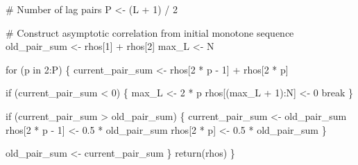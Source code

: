 \documentclass[
  letterpaper,
  DIV=11,
  numbers=noendperiod]{scrartcl}
\newenvironment{Shaded}{\begin{snugshade}}{\end{snugshade}}
\newcommand{\CommentTok}[1]{\textcolor[rgb]{0.37,0.37,0.37}{#1}}
\newcommand{\ControlFlowTok}[1]{\textcolor[rgb]{0.00,0.23,0.31}{#1}}
\newcommand{\DecValTok}[1]{\textcolor[rgb]{0.68,0.00,0.00}{#1}}
\newcommand{\FloatTok}[1]{\textcolor[rgb]{0.68,0.00,0.00}{#1}}
\newcommand{\FunctionTok}[1]{\textcolor[rgb]{0.28,0.35,0.67}{#1}}
\newcommand{\NormalTok}[1]{\textcolor[rgb]{0.00,0.23,0.31}{#1}}
\newcommand{\OtherTok}[1]{\textcolor[rgb]{0.00,0.23,0.31}{#1}}
\newcommand{\SpecialCharTok}[1]{\textcolor[rgb]{0.37,0.37,0.37}{#1}}
\begin{document}
\begin{Shaded}
\begin{Highlighting}[]
  \CommentTok{\# Number of lag pairs}
\NormalTok{  P }\OtherTok{\textless{}{-}}\NormalTok{ (L }\SpecialCharTok{+} \DecValTok{1}\NormalTok{) }\SpecialCharTok{/} \DecValTok{2}

  \CommentTok{\# Construct asymptotic correlation from initial monotone sequence}
\NormalTok{  old\_pair\_sum }\OtherTok{\textless{}{-}}\NormalTok{ rhos[}\DecValTok{1}\NormalTok{] }\SpecialCharTok{+}\NormalTok{ rhos[}\DecValTok{2}\NormalTok{]}
\NormalTok{  max\_L }\OtherTok{\textless{}{-}}\NormalTok{ N}

  \ControlFlowTok{for}\NormalTok{ (p }\ControlFlowTok{in} \DecValTok{2}\SpecialCharTok{:}\NormalTok{P) \{}
\NormalTok{    current\_pair\_sum }\OtherTok{\textless{}{-}}\NormalTok{ rhos[}\DecValTok{2} \SpecialCharTok{*}\NormalTok{ p }\SpecialCharTok{{-}} \DecValTok{1}\NormalTok{] }\SpecialCharTok{+}\NormalTok{ rhos[}\DecValTok{2} \SpecialCharTok{*}\NormalTok{ p]}
  
    \ControlFlowTok{if}\NormalTok{ (current\_pair\_sum }\SpecialCharTok{\textless{}} \DecValTok{0}\NormalTok{) \{}
\NormalTok{      max\_L }\OtherTok{\textless{}{-}} \DecValTok{2} \SpecialCharTok{*}\NormalTok{ p}
\NormalTok{      rhos[(max\_L }\SpecialCharTok{+} \DecValTok{1}\NormalTok{)}\SpecialCharTok{:}\NormalTok{N] }\OtherTok{\textless{}{-}} \DecValTok{0}
      \ControlFlowTok{break}
\NormalTok{    \}}
  
    \ControlFlowTok{if}\NormalTok{ (current\_pair\_sum }\SpecialCharTok{\textgreater{}}\NormalTok{ old\_pair\_sum) \{}
\NormalTok{      current\_pair\_sum }\OtherTok{\textless{}{-}}\NormalTok{ old\_pair\_sum}
\NormalTok{      rhos[}\DecValTok{2} \SpecialCharTok{*}\NormalTok{ p }\SpecialCharTok{{-}} \DecValTok{1}\NormalTok{] }\OtherTok{\textless{}{-}} \FloatTok{0.5} \SpecialCharTok{*}\NormalTok{ old\_pair\_sum}
\NormalTok{      rhos[}\DecValTok{2} \SpecialCharTok{*}\NormalTok{ p] }\OtherTok{\textless{}{-}} \FloatTok{0.5} \SpecialCharTok{*}\NormalTok{ old\_pair\_sum}
\NormalTok{    \}}
  
\NormalTok{    old\_pair\_sum }\OtherTok{\textless{}{-}}\NormalTok{ current\_pair\_sum}
\NormalTok{  \}}
  \FunctionTok{return}\NormalTok{(rhos)}
\NormalTok{\}}


\end{Highlighting}
\end{Shaded}
\end{document}
